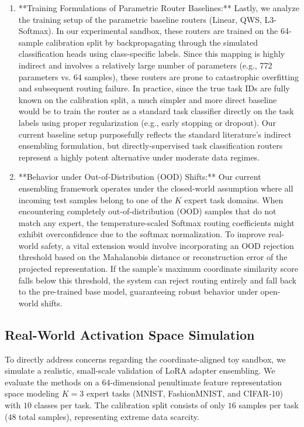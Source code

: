 \begin{enumerate}
    \item **Training Formulations of Parametric Router Baselines:**
    Lastly, we analyze the training setup of the parametric baseline routers (Linear, QWS, L3-Softmax). In our experimental sandbox, these routers are trained on the 64-sample calibration split by backpropagating through the simulated classification heads using class-specific labels. Since this mapping is highly indirect and involves a relatively large number of parameters (e.g., 772 parameters vs. 64 samples), these routers are prone to catastrophic overfitting and subsequent routing failure. In practice, since the true task IDs are fully known on the calibration split, a much simpler and more direct baseline would be to train the router as a standard task classifier directly on the task labels using proper regularization (e.g., early stopping or dropout). Our current baseline setup purposefully reflects the standard literature's indirect ensembling formulation, but directly-supervised task classification routers represent a highly potent alternative under moderate data regimes.

    \item **Behavior under Out-of-Distribution (OOD) Shifts:**
    Our current ensembling framework operates under the closed-world assumption where all incoming test samples belong to one of the $K$ expert task domains. When encountering completely out-of-distribution (OOD) samples that do not match any expert, the temperature-scaled Softmax routing coefficients might exhibit overconfidence due to the softmax normalization. To improve real-world safety, a vital extension would involve incorporating an OOD rejection threshold based on the Mahalanobis distance or reconstruction error of the projected representation. If the sample's maximum coordinate similarity score falls below this threshold, the system can reject routing entirely and fall back to the pre-trained base model, guaranteeing robust behavior under open-world shifts.
\end{enumerate}

\subsection{Real-World Activation Space Simulation}
\label{sec:app_real_world_sim}

To directly address concerns regarding the coordinate-aligned toy sandbox, we simulate a realistic, small-scale validation of LoRA adapter ensembling. We evaluate the methods on a $64$-dimensional penultimate feature representation space modeling $K=3$ expert tasks (MNIST, FashionMNIST, and CIFAR-10) with $10$ classes per task. The calibration split consists of only $16$ samples per task ($48$ total samples), representing extreme data scarcity.

